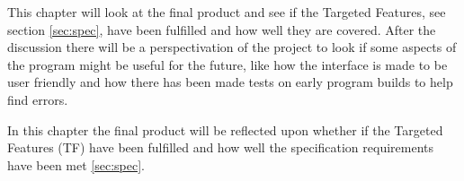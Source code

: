 This chapter will look at the final product and see if the Targeted Features, see section \ref{sec:spec}, have been fulfilled and how well they are covered. After the discussion there will be a perspectivation of the project to look if some aspects of the program might be useful for the future, like how the interface is made to be user friendly and how there has been made tests on early program builds to help find errors.

In this chapter the final product will be reflected upon whether if the Targeted Features (TF) have been fulfilled and how well the specification requirements have been met \ref{sec:spec}.
